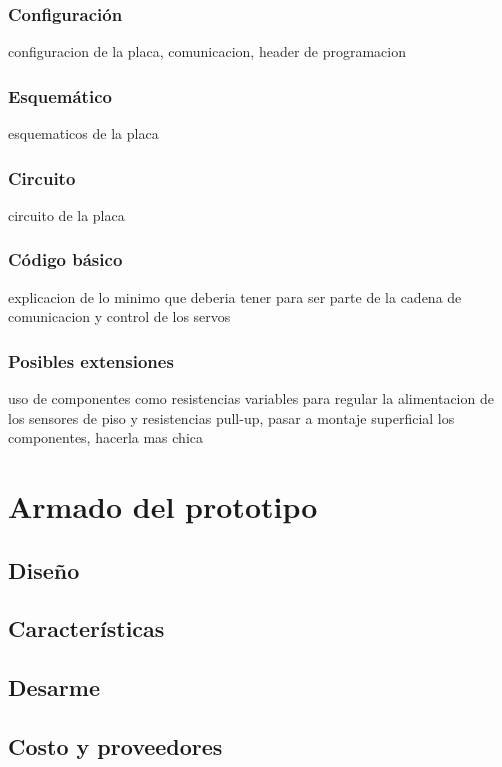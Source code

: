 \subsubsection{Configuraci\'on}
\label{}

configuracion de la placa, comunicacion, header de programacion

\subsubsection{Esquem\'atico}
\label{}

esquematicos de la placa

\subsubsection{Circuito}
\label{}

circuito de la placa

\subsubsection{C\'odigo b\'asico}
\label{}

explicacion de lo minimo que deberia tener para ser parte de la cadena de comunicacion y control de los servos

\subsubsection{Posibles extensiones}
\label{}

uso de componentes como resistencias variables para regular la alimentacion de los sensores de piso y resistencias pull-up, pasar a montaje superficial los componentes, hacerla mas chica

\section{Armado del prototipo}
\label{}

\subsection{Dise\~no}
\label{}

\subsection{Caracter\'isticas}
\label{}

\subsection{Desarme}
\label{}

\subsection{Costo y proveedores}
\label{}
